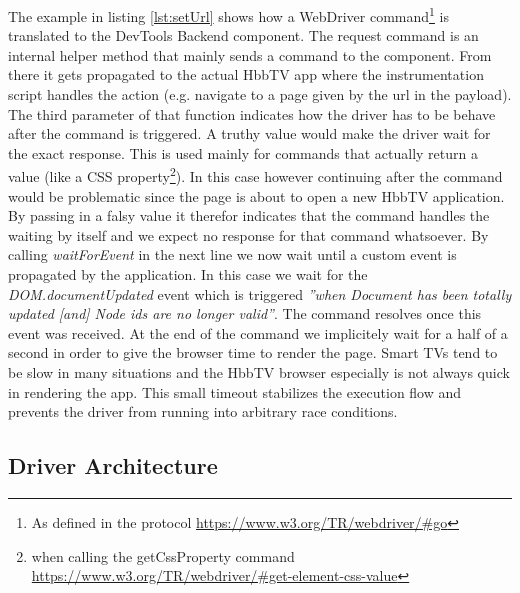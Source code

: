 The example in listing \ref{lst:setUrl} shows how a WebDriver command\footnote{As defined in the protocol
\url{https://www.w3.org/TR/webdriver/\#go}} is translated to the DevTools Backend component. The request
command is an internal helper method that mainly sends a command to the component. From there it gets propagated
to the actual HbbTV app where the instrumentation script handles the action (e.g. navigate to a page given
by the url in the payload). The third parameter of that function indicates how the driver has to be behave
after the command is triggered. A truthy value would make the driver wait for the exact response. This is used
mainly for commands that actually return a value (like a CSS property\footnote{when calling the getCssProperty
command \url{https://www.w3.org/TR/webdriver/\#get-element-css-value}}). In this case however continuing after
the command would be problematic since the page is about to open a new HbbTV application. By passing in a falsy
value it therefor indicates that the command handles the waiting by itself and we expect no response for that
command whatsoever. By calling \textit{waitForEvent} in the next line we now wait until a custom event is
propagated by the application. In this case we wait for the \textit{DOM.documentUpdated} event which is triggered
\textit{''when Document has been totally updated [and] Node ids are no longer valid''}\cite{devtoolsprotocolDOM}.
The command resolves once this event was received. At the end of the command we implicitely wait for a half of
a second in order to give the browser time to render the page. Smart TVs tend to be slow in many situations and
the HbbTV browser especially is not always quick in rendering the app. This small timeout stabilizes the
execution flow and prevents the driver from running into arbitrary race conditions.

\subsection{Driver Architecture\label{sec:implDriver}}

